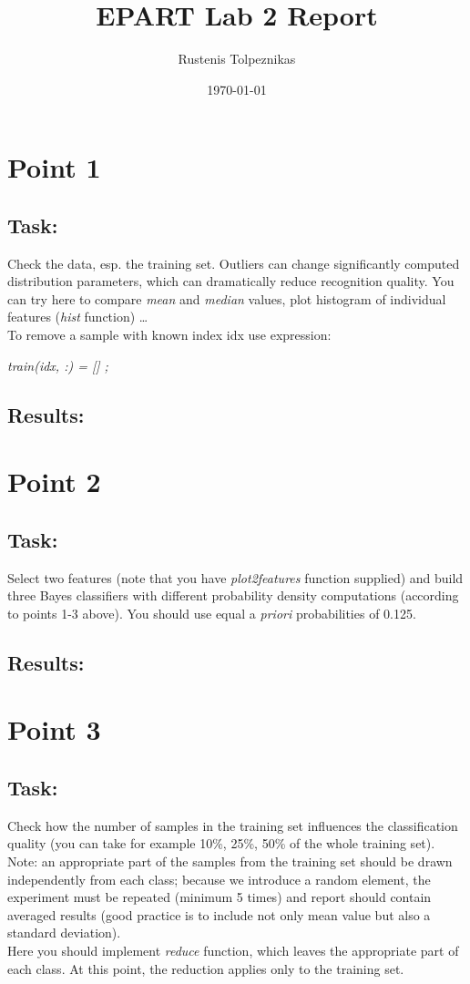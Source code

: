 \documentclass[
  a4paper,            %
  DIV=10,             %
  oneside,            %
  BCOR=5mm,           %
  parskip=half,       %
  numbers=noenddot,   %
  bibtotoc,           %
  listof=totoc        %
]{scrreprt}
\title{EPART Lab 2 Report}
\author{Rustenis Tolpeznikas}
\date{\today}
\begin{document}
\maketitle
\newpage

\section*{Point 1}
\subsection*{Task:}
Check the data, esp. the training set.
Outliers can change significantly computed distribution parameters, which can dramatically reduce recognition quality.
You can try here to compare \textit{mean} and \textit{median} values, plot histogram of individual features (\textit{hist} function) …
\\
To remove a sample with known index idx use expression:
\begin{center}
    \textit{train(idx, :) = [] ;}
\end{center}

\subsection*{Results:}

\section*{Point 2}
\subsection*{Task:}
Select two features (note that you have \textit{plot2features} function supplied) and build three Bayes classifiers with different probability density computations (according to points 1-3 above).
You should use equal a \textit{priori} probabilities of 0.125.
\subsection*{Results:}

\section*{Point 3}
\subsection*{Task:}
Check how the number of samples in the training set influences the classification quality (you can take for example 10\%, 25\%, 50\% of the whole training set).
\\
Note: an appropriate part of the samples from the training set should be drawn independently from each class; because we introduce a random element, the experiment must be repeated (minimum 5 times) and report should contain averaged results (good practice is to include not only mean value but also a standard deviation).
\\
Here you should implement \textit{reduce} function, which leaves the appropriate part of each class.
At this point, the reduction applies only to the training set.
\end{document}

